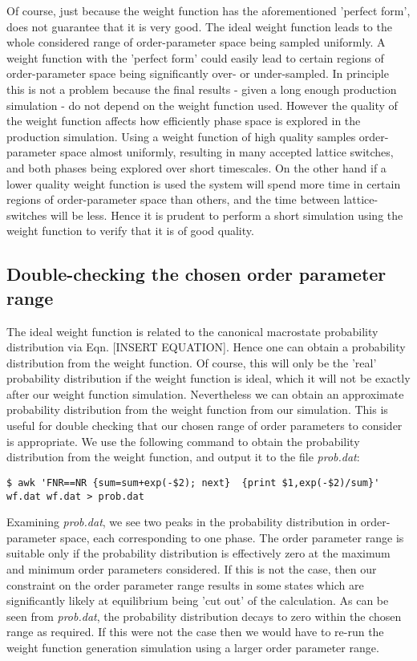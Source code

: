 \documentclass{report}
\begin{document}
Of course, just because the weight function has the aforementioned 'perfect form', does not guarantee that it is very good. The ideal weight function
leads to the whole considered range of order-parameter space being sampled uniformly. A weight function with the 'perfect form' could easily lead to
certain regions of order-parameter space being significantly over- or under-sampled. In principle this is not a problem because the final results - given
a long enough production simulation - do not depend on the weight function used. However the quality of the weight function affects how efficiently 
phase space is explored in the production simulation. Using a weight function of high quality samples order-parameter space almost uniformly, resulting
in many accepted lattice switches, and both phases being explored over short timescales. On the other hand if a lower quality weight function is used the
system will spend more time in certain regions of order-parameter space than others, and the time between lattice-switches will be less. Hence it is prudent
to perform a short simulation using the weight function to verify that it is of good quality.

\subsection{Double-checking the chosen order parameter range}
The ideal weight function is related to the canonical macrostate probability distribution via Eqn. [INSERT EQUATION]. Hence one can obtain a probability
distribution from the weight function. Of course, this will only be the 'real' probability distribution if the weight function is ideal, which it
will not be exactly after our weight function simulation. Nevertheless we can obtain an approximate probability distribution from the weight
function from our simulation. This is useful for double checking that our chosen range of order parameters to consider is appropriate. We use the
following command to obtain the probability distribution from the weight function, and output it to the file \emph{prob.dat}:
\begin{verbatim}
$ awk 'FNR==NR {sum=sum+exp(-$2); next}  {print $1,exp(-$2)/sum}' wf.dat wf.dat > prob.dat
\end{verbatim}
Examining \emph{prob.dat}, we see two peaks in the probability distribution in order-parameter space, each corresponding to one phase. The order parameter
range is suitable only if the probability distribution is effectively zero at the maximum and minimum order parameters considered. If this is not the
case, then our constraint on the order parameter range results in some states which are significantly likely at equilibrium being 'cut out' of the
calculation. As can be seen from \emph{prob.dat}, the probability distribution decays to zero within the chosen range as required. If this were not the
case then we would have to re-run the weight function generation simulation using a larger order parameter range.
\end{document}
